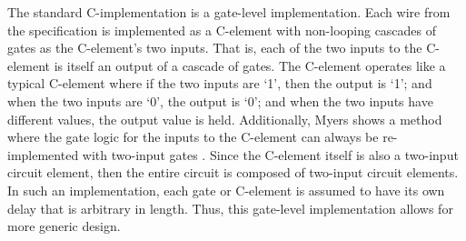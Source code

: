 \documentclass[12pt]{report}
\begin{document}
The standard C-implementation is a gate-level implementation.  Each wire from the specification is implemented as a C-element with non-looping cascades of gates as the C-element's two inputs.  That is, each of the two inputs to the C-element is itself an output of a cascade of gates.  The C-element operates like a typical C-element where if the two inputs are `1', then the output is `1'; and when the two inputs are `0', the output is `0'; and when the two inputs have different values, the output value is held.  Additionally, Myers shows a method where the gate logic for the inputs to the C-element can always be re-implemented with two-input gates \cite{myers_book_2004}.  Since the C-element itself is also a two-input circuit element, then the entire circuit is composed of two-input circuit elements.  In such an implementation, each gate or C-element is assumed to have its own delay that is arbitrary in length.  Thus, this gate-level implementation allows for more generic design.
\end{document}
